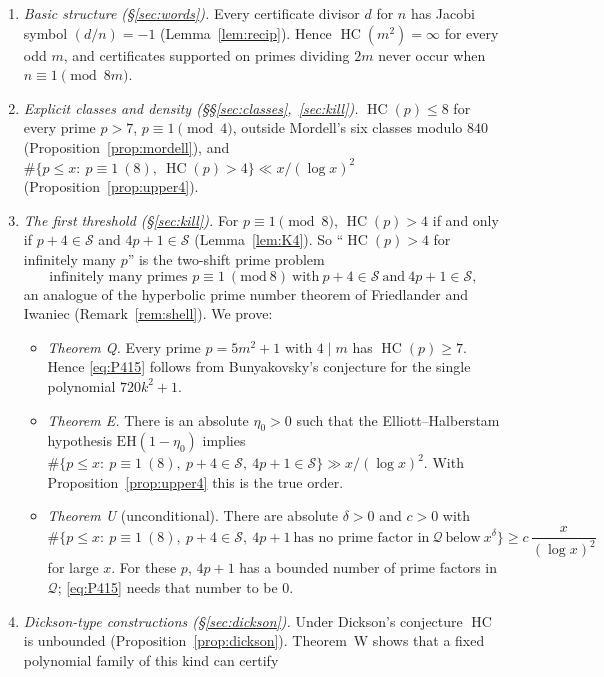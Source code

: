 \documentclass[11pt,reqno]{amsart}
\theoremstyle{definition}
\newcommand{\cS}{\mathcal S}
\newcommand{\cQ}{\mathcal Q}
\newcommand{\HC}{\operatorname{HC}}
\newcommand{\EH}{\mathrm{EH}}
\begin{document}
\begin{enumerate}
\item\emph{Basic structure (\S\ref{sec:words}).}  Every certificate divisor
$d$ for $n$ has Jacobi symbol $(d/n)=-1$ (Lemma~\ref{lem:recip}).  Hence
$\HC(m^2)=\infty$ for every odd $m$, and certificates supported on primes
dividing $2m$ never occur when $n\equiv1\pmod{8m}$.
\item\emph{Explicit classes and density (\S\S\ref{sec:classes},~\ref{sec:kill}).}  $\HC(p)\le8$ for every
prime $p>7$, $p\equiv1\pmod 4$, outside Mordell's six classes modulo
$840$ (Proposition~\ref{prop:mordell}), and
$\#\{p\le x:\ p\equiv1\ (8),\ \HC(p)>4\}\ll x/(\log x)^2$
(Proposition~\ref{prop:upper4}).
\item\emph{The first threshold (\S\ref{sec:kill}).}  For $p\equiv1\pmod8$,
$\HC(p)>4$ if and only if $p+4\in\cS$ and $4p+1\in\cS$
(Lemma~\ref{lem:K4}).  So ``$\HC(p)>4$ for infinitely many $p$'' is the
two-shift prime problem
\begin{equation}\label{eq:P415}
\text{infinitely many primes } p\equiv1\ (\mathrm{mod}\ 8)\ \text{with}\ p+4\in\cS\ \text{and}\ 4p+1\in\cS,
\end{equation}
an analogue of the hyperbolic prime number theorem of Friedlander and
Iwaniec \cite{FI09} (Remark~\ref{rem:shell}).  We prove:
\begin{itemize}
\item \emph{Theorem Q.} Every prime $p=5m^2+1$ with $4\mid m$ has
$\HC(p)\ge7$.  Hence \eqref{eq:P415} follows from Bunyakovsky's conjecture
for the single polynomial $720k^2+1$.
\item \emph{Theorem E.} There is an absolute $\eta_0>0$ such that the
Elliott--Halberstam hypothesis $\EH(1-\eta_0)$ implies
$\#\{p\le x:\ p\equiv1\ (8),\ p+4\in\cS,\ 4p+1\in\cS\}\gg x/(\log x)^2$.
With Proposition~\ref{prop:upper4} this is the true order.
\item \emph{Theorem U} (unconditional).  There are absolute $\delta>0$ and
$c>0$ with
\[
\#\{p\le x:\ p\equiv1\ (8),\ p+4\in\cS,\ 4p+1\ \text{has no prime factor in}\ \cQ\ \text{below}\ x^{\delta}\}\ge c\,\frac{x}{(\log x)^2}
\]
for large $x$.  For these $p$, $4p+1$ has a bounded number of prime
factors in $\cQ$; \eqref{eq:P415} needs that number to be $0$.
\end{itemize}
\item\emph{Dickson-type constructions (\S\ref{sec:dickson}).}  Under
Dickson's conjecture $\HC$ is unbounded (Proposition~\ref{prop:dickson}).
Theorem~W shows that a fixed polynomial family of this kind can certify

\end{enumerate}
\end{document}
